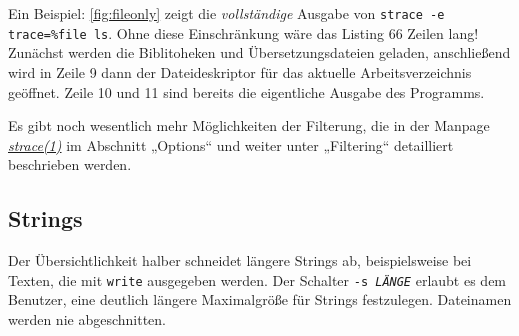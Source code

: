 Ein Beispiel: \autoref{fig:fileonly} zeigt die \emph{vollständige} Ausgabe von \texttt{strace -e
trace=\%file ls}. Ohne diese Einschränkung wäre das Listing 66 Zeilen lang! Zunächst werden
die Biblitoheken und Übersetzungsdateien geladen, anschließend wird in Zeile 9 dann der
Dateideskriptor für das aktuelle Arbeitsverzeichnis geöffnet. Zeile 10 und 11 sind bereits
die eigentliche Ausgabe des Programms.

Es gibt noch wesentlich mehr Möglichkeiten der Filterung, die in der Manpage
\href{http://man7.org/linux/man-pages/man1/strace.1.html#OPTIONS}{\emph{strace(1)}} im Abschnitt
„Options“ und weiter unter „Filtering“ detailliert beschrieben werden.

\subsection{Strings}

Der Übersichtlichkeit halber schneidet \strace{} längere Strings ab, beispielsweise bei Texten, die
mit \texttt{write} ausgegeben werden. Der Schalter \texttt{-s \emph{LÄNGE}} erlaubt es dem
Benutzer, eine deutlich längere Maximalgröße für Strings festzulegen. Dateinamen werden nie
abgeschnitten.
